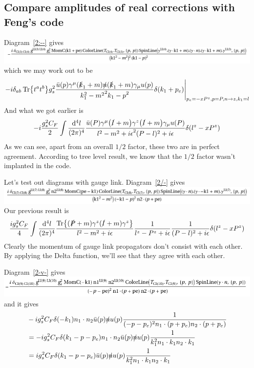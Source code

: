 \documentclass{article}
\DeclarePairedDelimiter\bracketM{[}{]}
\let\bqty\relax
\newcommand{\bqty}[1]{\bracketM*{#1}}
\newcommand{\mm}[1]{\frac{\dd^4#1}{(2\pi)^4}}
\begin{document}
\subsection{Compare amplitudes of real corrections with Feng's code}
Diagram~\ref{2:--} gives \\
\includegraphics[width=\linewidth]{image2.png}\\
which we may work out to be 
\begin{align}
	\eval{-i\delta_{ab}\Tr{t^at^b}g_s^2\frac{\bar u(p)\gamma^{\mu}(\slashed{k}_1+m)\slashed n(\slashed{k}_1+m)\gamma_{\mu} u(p)}{\bqty{k_1^2-m^2}^2\bqty{k_1-p}^2}\delta(k_1+p_e)}_{p_e=-x P^z,p=P,n\to z,k_1=l}
\end{align}
And what we got earlier is
\begin{align}
	-i\frac{g_s^2C_F}{2}\int\mm{l} \frac{\bar u(P) \gamma^\mu\pqty{\slashed l+m}\gamma^z\pqty{\slashed l+m}\gamma_{\mu} u(P)}{\bqty{l^2-m^2+i\epsilon}^2\bqty{(P-l)^2+i\epsilon}}\delta(l^z-xP^z)
\end{align}
As we can see, apart from an overall $1/2$ factor, these two are in perfect agreement. According to tree level result, we know that the $1/2$ factor wasn't implanted in the code. 

Let's test out diagrams with gauge link. Diagram~\ref{2/-} gives\\
\includegraphics[width=\linewidth]{image4.png}
\\

Our previous result is 
\begin{align}
	\frac{ig_s^2C_F}{4}\int\mm{l}  \frac{\Tr{(\slashed P+m)\gamma^z(\slashed l+m)\gamma^z}}{l^2-m^2+i\epsilon}\frac{1}{l^z-P^z+i\epsilon}\frac{1}{(P-l)^2+i\epsilon} \delta(l^z-xP^z)
\end{align}
Clearly the momentum of gauge link propagators don't consist with each other. By applying the Delta function, we'll see that they agree with each other. 

Diagram~\ref{2-v-} gives\\
	\includegraphics[width=\linewidth]{image9.png}
\\and it gives
\begin{align}
	&-ig_s^2C_F\delta(-k_1)n_1\cdot n_2\bar u(p)\slashed nu(p)\frac{1}{(-p-p_e)^2n_1\cdot(p+p_e)n_2\cdot(p+p_e)}\\
	&=-ig_s^2C_F\delta(k_1-p-p_e)n_1\cdot n_2\bar u(p)\slashed nu(p)\frac{1}{k_1^2n_1\cdot k_1n_2\cdot k_1}\\
	&=ig_s^2C_F\delta(k_1-p-p_e)\bar u(p)\slashed nu(p)\frac{1}{k_1^2n_1\cdot k_1n_2\cdot k_1}\label{2-v-:code}
\end{align}
\end{document}
